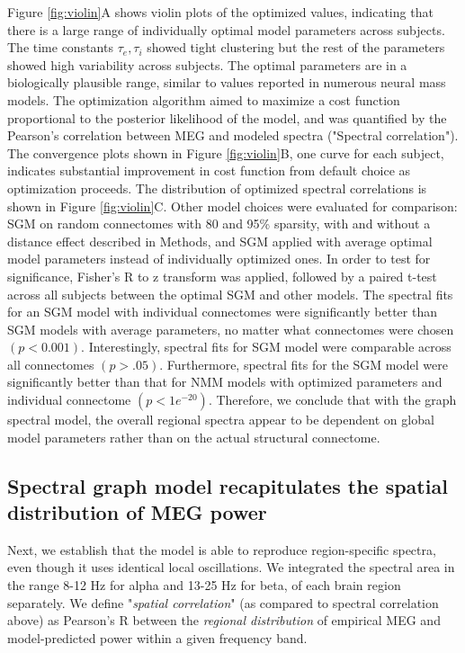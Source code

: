 Figure \ref{fig:violin}A shows violin plots of the optimized values,
indicating that there is a large range of individually optimal model
parameters across subjects. The time constants $\tau_{e}, \tau_{i}$
showed tight clustering but the rest of the parameters showed high
variability across subjects. The optimal parameters are in a
biologically plausible range, similar to values reported in numerous
neural mass models. The optimization algorithm aimed to maximize a cost
function proportional to the posterior likelihood of the model, and was
quantified by the Pearson's correlation between MEG and modeled spectra
("Spectral correlation"). The convergence plots shown in
Figure \ref{fig:violin}B, one curve for each subject, indicates substantial
improvement in cost function from default choice as optimization
proceeds. The distribution of optimized spectral correlations is shown
in Figure \ref{fig:violin}C. Other model choices were evaluated for comparison: SGM
on random connectomes with 80 and 95\% sparsity, with and without a
distance effect described in Methods, and SGM applied with average
optimal model parameters instead of individually optimized ones. In
order to test for significance, Fisher's R to z transform was applied,
followed by a paired t-test across all subjects between the optimal SGM
and other models. The spectral fits for an SGM model with individual
connectomes were significantly better than SGM models with average
parameters, no matter what connectomes were chosen $(p<0.001)$.
Interestingly, spectral fits for SGM model were comparable across all
connectomes $(p >.05)$. Furthermore, spectral fits for the SGM
model were significantly better than that for NMM models with optimized
parameters and individual connectome $(p < 1e^{-20})$. Therefore, we
conclude that with the graph spectral model, the overall regional
spectra appear to be dependent on global model parameters rather than on
the actual structural connectome.

\subsection{Spectral graph model recapitulates the spatial distribution of
MEG power}

Next, we establish that the model is able to reproduce region-specific
spectra, even though it uses identical local oscillations. We integrated
the spectral area in the range 8-12 Hz for alpha and 13-25 Hz for beta,
of each brain region separately. We define "\emph{spatial
correlation}" (as compared to spectral correlation above) as Pearson's
R between the \emph{regional distribution} of empirical MEG and
model-predicted power within a given frequency band.

